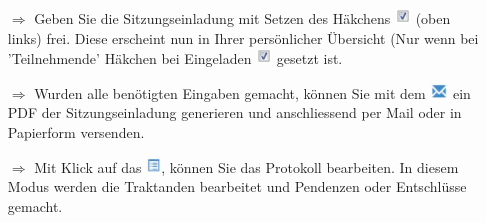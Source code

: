 \documentclass{article}
\begin{document}
\begin{multicols}{2}
\begin{tcolorbox}[colback=blue!5,colframe=blue!40!black,title=Eine Einladung bearbeiten / versenden]
\begin{itemize}
  \item[$\Longrightarrow$] Geben Sie die Sitzungseinladung mit Setzen des Häkchens \includegraphics[height=12pt]{Icons/sbox_ok.jpg} (oben links) frei. Diese erscheint nun in Ihrer persönlicher Übersicht (Nur wenn bei 'Teilnehmende' Häkchen bei Eingeladen \includegraphics[height=12pt]{Icons/sbox_ok.jpg} gesetzt ist.
  \item[$\Longrightarrow$] Wurden alle benötigten Eingaben gemacht, können Sie mit dem \includegraphics[height=12pt]{Icons/Briefsymbol.jpg} ein PDF der Sitzungseinladung generieren und anschliessend per Mail oder in Papierform versenden.
  \item[$\Longrightarrow$] Mit Klick auf das \includegraphics[height=12pt]{Icons/Listensymbol.jpg}, können Sie das Protokoll bearbeiten. In diesem Modus werden die Traktanden bearbeitet und Pendenzen oder Entschlüsse gemacht.		
\end{itemize}
\end{tcolorbox}


\end{multicols}

\end{document}
